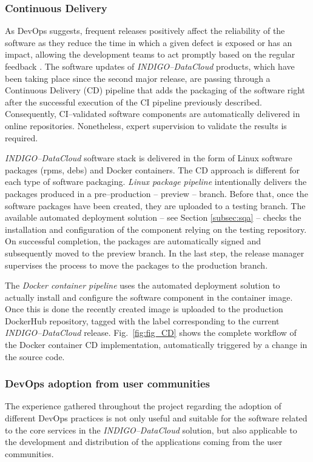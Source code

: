 \subsubsection{Continuous Delivery}
As DevOps suggests, frequent releases positively affect the reliability of the software as
they reduce the time in which a given defect is exposed or has an impact, allowing the
development teams to act promptly based on the regular feedback \cite{chen2015}. The software updates of
{\sl INDIGO--DataCloud} products, which have been taking place since the second major release, are passing through
a Continuous Delivery (CD) pipeline that adds the packaging of the software right after the
successful execution of the CI pipeline previously described. Consequently, CI--validated
software components are automatically delivered in online repositories. Nonetheless,
expert supervision to validate the results is required.

{\sl INDIGO--DataCloud} software stack is delivered in the form of Linux software packages (rpms, debs)
and Docker containers. The CD approach is different for each type of software packaging. \textit{Linux
package pipeline} intentionally delivers the packages produced in a pre--production -- preview --
branch. Before that, once the software packages have been created, they are uploaded to a
testing branch. The available automated deployment solution -- see Section \ref{subsec:sqa} -- checks
the installation and configuration of the component relying on the testing repository. On
successful completion, the packages are automatically signed and subsequently moved to
the preview branch.
In the last step, the release manager supervises the process to move the  packages to the
production branch.

The \textit{Docker container pipeline} uses the automated deployment solution to
actually install and configure the software component in the container image. Once this is
done the recently created image is uploaded to the production DockerHub repository, tagged
with the label corresponding to the current {\sl INDIGO--DataCloud} release.
Fig.~\ref{fig:fig_CD} shows the complete workflow of the Docker container CD implementation,
automatically triggered by a change in the source code.


\subsubsection{DevOps adoption from user communities}

The experience gathered throughout the project regarding the adoption of
different DevOps practices is not only useful and suitable for the software related
to the core services in the {\sl INDIGO--DataCloud} solution, but also applicable to the
development and distribution of the applications coming from the user communities.

